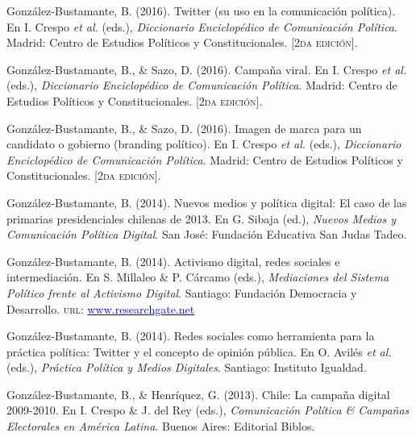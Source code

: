 \begin{publications}
\begin{benumerate}{12}
\item{\small González-Bustamante, B. (2016). Twitter (su uso en la comunicación política). En I. Crespo {\itshape et al.} (eds.), {\itshape Diccionario Enciclop\'edico de Comunicaci\'on Pol\'itica}. Madrid: Centro de Estudios Políticos y Constitucionales. {\footnotesize \scshape [2da edición]}.}\vspace{1mm}

\item{\small González-Bustamante, B., \& Sazo, D. (2016). Campaña viral. En I. Crespo {\itshape et al.} (eds.), {\itshape Diccionario Enciclop\'edico de Comunicaci\'on Pol\'itica}. Madrid: Centro de Estudios Políticos y Constitucionales. {\footnotesize \scshape [2da edición]}.}\vspace{1mm}

\item{\small González-Bustamante, B., \& Sazo, D. (2016). Imagen de marca para un candidato o gobierno (branding político). En I. Crespo {\itshape et al.} (eds.), {\itshape Diccionario Enciclop\'edico de Comunicaci\'on Pol\'itica}. Madrid: Centro de Estudios Políticos y Constitucionales. {\footnotesize \scshape [2da edición]}.}\vspace{1mm}

\item{\small González-Bustamante, B. (2014). Nuevos medios y política digital: El caso de las primarias presidenciales chilenas de 2013. En G. Sibaja (ed.), {\itshape Nuevos Medios y Comunicaci\'on Pol\'itica Digital}. San José: Fundación Educativa San Judas Tadeo.}\vspace{1mm}

\item{\small González-Bustamante, B. (2014). Activismo digital, redes sociales e intermediación. En S. Millaleo \& P. C\'arcamo (eds.), {\itshape Mediaciones del Sistema Pol\'itico frente al Activismo Digital}. Santiago: Fundación Democracia y Desarrollo. {\scshape url}: \href{https://www.researchgate.net/publication/321992867_Activismo_digital_redes_sociales_e_intermediacion}{\textcolor{blue}{www.researchgate.net}}}\vspace{1mm}

\item{\small González-Bustamante, B. (2014). Redes sociales como herramienta para la pr\'actica pol\'itica: Twitter y el concepto de opini\'on p\'ublica. En O. Avil\'es {\itshape et al.} (eds.), {\itshape Pr\'actica Pol\'itica y Medios Digitales}. Santiago: Instituto Igualdad.}\vspace{1mm}

\item{\small González-Bustamante, B., \& Henr\'iquez, G. (2013). Chile: La campaña digital 2009-2010. En I. Crespo \& J. del Rey (eds.), {\itshape Comunicaci\'on Pol\'itica \& Campa\~nas Electorales en Am\'erica Latina}. Buenos Aires: Editorial Biblos.}\vspace{1mm}

\end{benumerate}

\end{publications}
